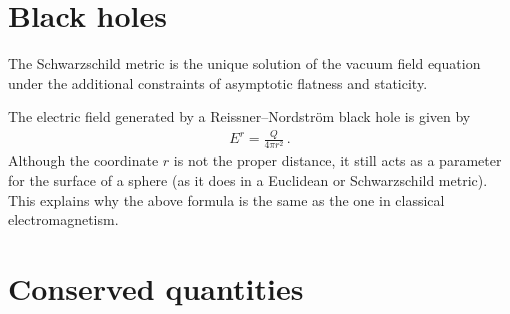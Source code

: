 \section{Black holes}


    \begin{theorem}[Birkhoff]
        The Schwarzschild metric is the unique solution of the vacuum field equation under the additional constraints of asymptotic flatness and staticity.
    \end{theorem}


    \begin{remark}
        The electric field generated by a Reissner--Nordstr\"om black hole is given by
        \begin{gather}
            E^r = \frac{Q}{4\pi r^2}\,.
        \end{gather}
        Although the coordinate $r$ is not the proper distance, it still acts as a parameter for the surface of a sphere (as it does in a Euclidean or Schwarzschild metric). This explains why the above formula is the same as the one in classical electromagnetism.
    \end{remark}


\section{Conserved quantities}

